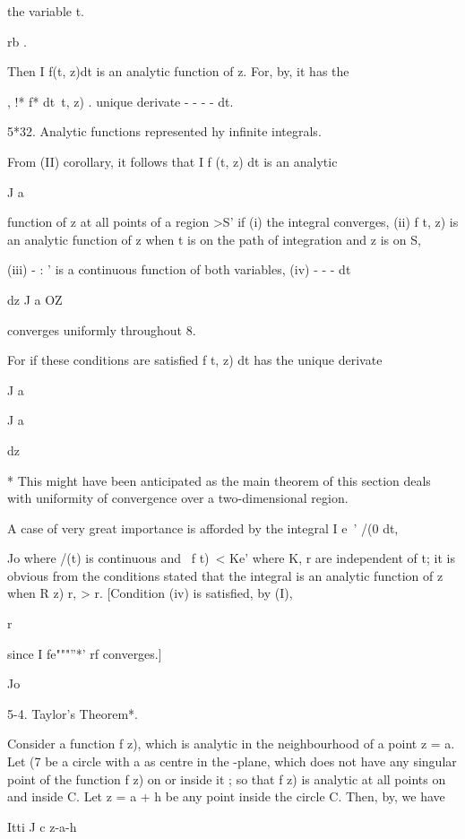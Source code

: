 {{the variable t.

rb .

Then I f(t, z)dt is an analytic function of z. For, by, it has
the

, !* f* dt\ t, z) . unique derivate - - - - dt.

5*32. Analytic functions represented hy infinite integrals.

From (II) corollary, it follows that I f (t, z) dt is an
analytic

J a

function of z at all points of a region >S' if (i) the integral
converges, (ii) f t, z) is an analytic function of z when t is on the
path of integration and z is on S,

(iii) - : ' is a continuous function of both variables, (iv) - - - dt

dz J a OZ

converges uniformly throughout 8.

For if these conditions are satisfied f t, z) dt has the unique
derivate

J a

J a

dz

* This might have been anticipated as the main theorem of this section
deals with uniformity of convergence over a two-dimensional region.

%
%

A case of very great importance is afforded by the integral I e~' /(0
dt,

Jo where /(t) is continuous and \ f t)\ < Ke' where K, r are
independent of t; it is obvious from the conditions stated that the
integral is an analytic function of z when R z) r, > r. [Condition
(iv) is satisfied, by (I),

r

since I fe"""''*' rf converges.]

Jo

5-4. Taylor's Theorem*.

Consider a function f z), which is analytic in the neighbourhood of a
point z = a. Let (7 be a circle with a as centre in the -plane, which
does not have any singular point of the function f z) on or inside it
; so that f z) is analytic at all points on and inside C. Let z = a +
h be any point inside the circle C. Then, by, we have

    Itti J c z-a-h

}}
